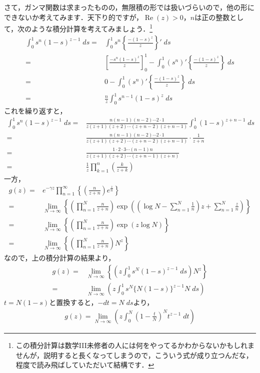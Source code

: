 \documentclass[./main]{subfile}
\begin{document}
さて，ガンマ関数は求まったものの，無限積の形では扱いづらいので，他の形にできないか考えてみます．天下り的ですが，$\operatorname{Re}(z)>0$，$n$は正の整数として，次のような積分計算を考えてみましょう．\footnote{この積分計算は数学III未修者の人には何をやってるかわからないかもしれませんが，説明すると長くなってしまうので，こういう式が成り立つんだな，程度で読み飛ばしていただいて結構です．}
\begin{align*}
\int_0^1s^n(1-s)^{z-1}\;ds=&\int_0^1s^n\left\{\frac{-(1-s)^z}{z}\right\}'\;ds\\
=&\left[\frac{-s^n(1-s)^z}{z}\right]_0^1-\int_0^1(s^n)'\left\{\frac{-(1-s)^z}{z}\right\}\;ds\\
=&0-\int_0^1(s^n)'\left\{\frac{-(1-s)^z}{z}\right\}\;ds\\
=&\frac{n}{z}\int_0^1s^{n-1}(1-s)^z\;ds
\end{align*}
これを繰り返すと，
\begin{align*}
\int_0^1s^n(1-s)^{z-1}\;ds=&\frac{n(n-1)(n-2)\cdots 2\cdot 1}{z(z+1)(z+2)\cdots (z+n-2)(z+n-1)}\int_0^1(1-s)^{z+n-1}\;ds\\
=&\frac{n(n-1)(n-2)\cdots 2\cdot 1}{z(z+1)(z+2)\cdots (z+n-2)(z+n-1)}\cdot\frac{1}{z+n}\\
=&\frac{1\cdot 2\cdot 3\cdots (n-1)n}{z(z+1)(z+2)\cdots (z+n-1)(z+n)}\\
=&\frac{1}{z}\prod_{k=1}^{n}\left(\frac{k}{z+k}\right)
\end{align*}
一方，
\begin{align*}
g(z)=&e^{-\gamma z}\prod_{n=1}^{\infty}\left\{\left(\frac{n}{z+n}\right)e^{\frac{z}{n}}\right\}\\
=&\lim_{N\to\infty}\left\{\left(\prod_{n=1}^N\frac{n}{z+n}\right)\exp\left(\left(\log N-\sum_{n=1}^N\frac{1}{n}\right)z+\sum_{n=1}^N\frac{z}{n}\right)\right\}\\
=&\lim_{N\to\infty}\left\{\left(\prod_{n=1}^N\frac{n}{z+n}\right)\exp(z\log N)\right\}\\
=&\lim_{N\to\infty}\left\{\left(\prod_{n=1}^N\frac{n}{z+n}\right)N^z\right\}
\end{align*}
なので，上の積分計算の結果より，
\begin{align*}
g(z)=&\lim_{N\to\infty}\left\{\left(z\int_0^1s^N(1-s)^{z-1}\;ds\right)N^z\right\}\\
=&\lim_{N\to\infty}\left(z\int_0^1s^N\{N(1-s)\}^{z-1}N\;ds\right)
\end{align*}
$t=N(1-s)$と置換すると，$-dt=N\;ds$より，
\begin{align*}
g(z)=\lim_{N\to\infty}\left(z\int_0^N\left(1-\frac{t}{N}\right)^Nt^{z-1}\;dt\right)
\end{align*}
\end{document}
